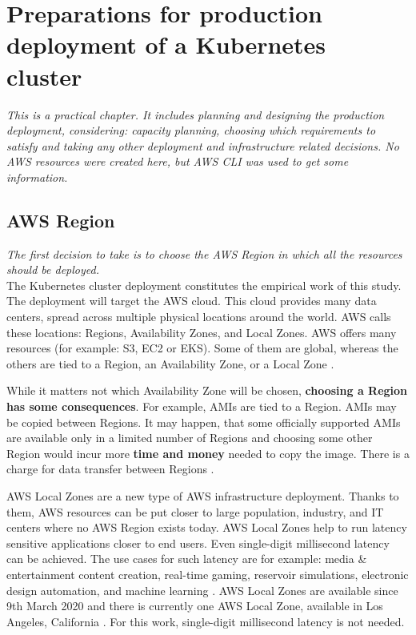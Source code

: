 \section{Preparations for production deployment of a Kubernetes cluster}
\label{prep-prod}
\textit{This is a practical chapter. It includes planning and designing the production deployment, considering: capacity planning, choosing which requirements to satisfy and taking any other deployment and infrastructure related decisions. No AWS resources were created here, but AWS CLI was used to get some information.}
~\\

\subsection{AWS Region}
\textit{The first decision to take is to choose the AWS Region in which all the resources should be deployed.}
\\

The Kubernetes cluster deployment constitutes the empirical work of this study. The deployment will target the AWS cloud. This cloud provides many data centers, spread across multiple physical locations around the world. AWS calls these locations: Regions, Availability Zones, and Local Zones. AWS offers many resources (for example: S3, EC2 or EKS). Some of them are global, whereas the others are tied to a Region, an Availability Zone, or a Local Zone \cite{az}.

While it matters not which Availability Zone will be chosen, \textbf{choosing a Region has some consequences}. For example, AMIs are tied to a Region. AMIs may be copied between Regions. It may happen, that some officially supported AMIs are available only in a limited number of Regions and choosing some other Region would incur more \textbf{time and money} needed to copy the image. There is a charge for data transfer between Regions \cite{az}.

AWS Local Zones are a new type of AWS infrastructure deployment. Thanks to them, AWS resources can be put closer to large population, industry, and IT centers where no AWS Region exists today. AWS Local Zones help to run latency sensitive applications closer to end users. Even single-digit millisecond latency can be achieved. The use cases for such latency are for example: media & entertainment content creation, real-time gaming, reservoir simulations, electronic design automation, and machine learning \cite{lz}. AWS Local Zones are available since 9th March 2020 and there is currently one AWS Local Zone, available in Los Angeles, California \cite{lz-blog}. For this work, single-digit millisecond latency is not needed.

